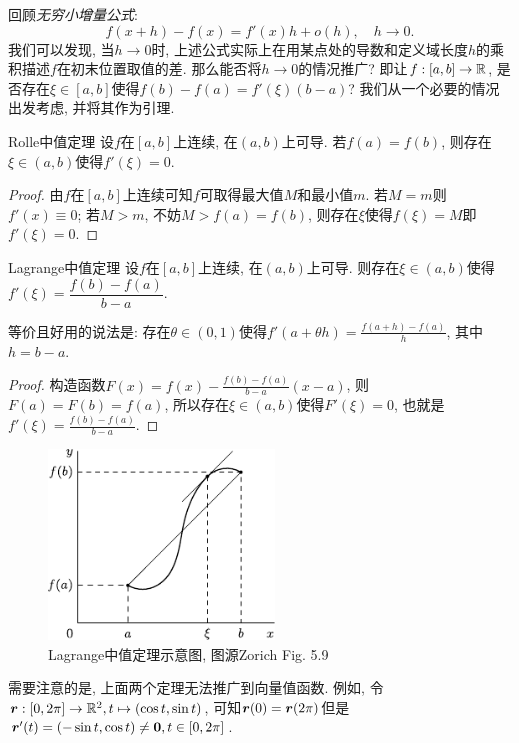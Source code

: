 回顾\textit{无穷小增量公式}: $$f(x+h)-f(x)=f'(x)h+o(h),\quad h \to 0.$$
我们可以发现, 当$h \to 0$时, 上述公式实际上在用某点处的导数和定义域长度$h$的乘积描述$f$在初末位置取值的差. 那么能否将$h \to 0$的情况推广? 即让$f:[a,b] \to \mathbb{R}$, 是否存在$\xi \in [a,b]$使得$f(b)-f(a)=f'(\xi) (b-a)$? 我们从一个必要的情况出发考虑, 并将其作为引理. 

\begin{theorem}{Rolle中值定理}
	设$f$在$[a,b]$上连续, 在$(a,b)$上可导. 若$f(a)=f(b)$, 则存在$\xi \in (a,b)$使得$f'(\xi )=0$. 
\end{theorem}
\begin{proof}
	由$f$在$[a,b]$上连续可知$f$可取得最大值$M$和最小值$m$. 若$M=m$则$f'(x) \equiv 0$; 若$M>m$, 不妨$M>f(a)=f(b)$, 则存在$\xi$使得$f(\xi)=M$即$f'(\xi) = 0$. 
\end{proof}

\begin{theorem}{Lagrange中值定理}
	设$f$在$[a,b]$上连续, 在$(a,b)$上可导. 则存在$\xi \in (a,b)$使得$f'(\xi) = \dfrac{f(b)-f(a)}{b-a}$. 
\end{theorem}
\begin{remark}
	等价且好用的说法是: 存在$\theta \in (0,1)$使得$f'(a+\theta h)=\frac{f(a+h)-f(a)}{h}$, 其中$h=b-a$. 
\end{remark}
\begin{proof}
	构造函数$F(x)=f(x)-\frac{f(b)-f(a)}{b-a}(x-a)$, 则$F(a)=F(b)=f(a)$, 所以存在$\xi \in (a,b)$使得$F'(\xi)=0$, 也就是$f'(\xi) = \frac{f(b)-f(a)}{b-a}$. 
\end{proof}

\begin{figure}[H]
	\centering
	\includegraphics[width=6cm]{./attachment/Lagrange中值定理.pdf}
	\caption{Lagrange中值定理示意图, 图源Zorich Fig. 5.9}
\end{figure}

需要注意的是, 上面两个定理无法推广到向量值函数. 例如, 令$\boldsymbol{r}:[0,2\pi] \to \mathbb{R} ^2,t \mapsto (\cos t,\sin t)$, 可知$\boldsymbol{r}(0)=\boldsymbol{r}(2\pi)$但是$\boldsymbol{r}'(t) = (-\sin t,\cos t) \neq \boldsymbol{0}, t \in [0,2\pi]$. 

